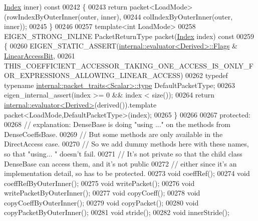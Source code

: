 \begin{DoxyCode}
      \hyperlink{group___core___module_a554f30542cc2316add4b1ea0a492ff02}{Index} inner)\textcolor{keyword}{ const}
00242 \textcolor{keyword}{    }\{
00243       \textcolor{keywordflow}{return} packet<LoadMode>(rowIndexByOuterInner(outer, inner),
00244                               colIndexByOuterInner(outer, inner));
00245     \}
00246 
00257     \textcolor{keyword}{template}<\textcolor{keywordtype}{int} LoadMode>
00258     EIGEN\_STRONG\_INLINE PacketReturnType packet(\hyperlink{group___core___module_a554f30542cc2316add4b1ea0a492ff02}{Index} index)\textcolor{keyword}{ const}
00259 \textcolor{keyword}{    }\{
00260       EIGEN\_STATIC\_ASSERT(\hyperlink{struct_eigen_1_1internal_1_1evaluator}{internal::evaluator<Derived>::Flags} & 
      \hyperlink{group__flags_ga4b983a15d57cd55806df618ac544d09e}{LinearAccessBit},
00261                           
      THIS\_COEFFICIENT\_ACCESSOR\_TAKING\_ONE\_ACCESS\_IS\_ONLY\_FOR\_EXPRESSIONS\_ALLOWING\_LINEAR\_ACCESS)
00262       \textcolor{keyword}{typedef} \textcolor{keyword}{typename} \hyperlink{group___sparse_core___module}{internal::packet\_traits<Scalar>::type} 
      DefaultPacketType;
00263       eigen\_internal\_assert(index >= 0 && index < size());
00264       \textcolor{keywordflow}{return} \hyperlink{struct_eigen_1_1internal_1_1evaluator}{internal::evaluator<Derived>}(derived()).\textcolor{keyword}{template} 
      packet<LoadMode,DefaultPacketType>(index);
00265     \}
00266 
00267   \textcolor{keyword}{protected}:
00268     \textcolor{comment}{// explanation: DenseBase is doing "using ..." on the methods from DenseCoeffsBase.}
00269     \textcolor{comment}{// But some methods are only available in the DirectAccess case.}
00270     \textcolor{comment}{// So we add dummy methods here with these names, so that "using... " doesn't fail.}
00271     \textcolor{comment}{// It's not private so that the child class DenseBase can access them, and it's not public}
00272     \textcolor{comment}{// either since it's an implementation detail, so has to be protected.}
00273     \textcolor{keywordtype}{void} coeffRef();
00274     \textcolor{keywordtype}{void} coeffRefByOuterInner();
00275     \textcolor{keywordtype}{void} writePacket();
00276     \textcolor{keywordtype}{void} writePacketByOuterInner();
00277     \textcolor{keywordtype}{void} copyCoeff();
00278     \textcolor{keywordtype}{void} copyCoeffByOuterInner();
00279     \textcolor{keywordtype}{void} copyPacket();
00280     \textcolor{keywordtype}{void} copyPacketByOuterInner();
00281     \textcolor{keywordtype}{void} stride();
00282     \textcolor{keywordtype}{void} innerStride();

\end{DoxyCode}

